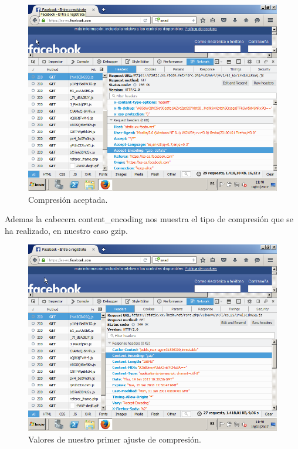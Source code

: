 \begin{figure}[H] %
	\centering
	\includegraphics[scale=0.5]{imagenes/accept.png}  %
	\caption{Compresión aceptada.} \label{fig:figura16}
\end{figure}



Ademas la cabecera content\_encoding nos muestra el tipo de compresión que se ha realizado, en nuestro caso gzip.
\begin{figure}[H] %
	\centering
	\includegraphics[scale=0.5]{imagenes/content.png}  %
	\caption{Valores de nuestro primer ajuste de compresión.} \label{fig:figura17}
\end{figure}










